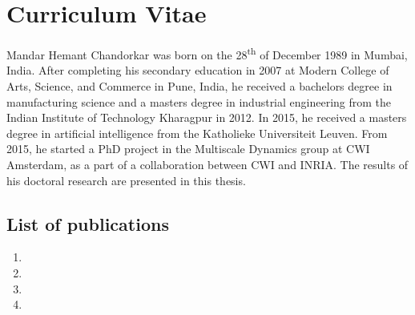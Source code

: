 \chapter*{Curriculum Vitae}\label{chapter:cv}
\thispagestyle{empty}


Mandar Hemant Chandorkar was born on the 28\textsuperscript{th} of December 1989 in Mumbai, India.
After completing his secondary education in 2007 at Modern College of Arts, Science, and Commerce 
in Pune, India, he received a bachelors degree in manufacturing science and a masters degree in 
industrial engineering from the Indian Institute of Technology Kharagpur in 2012. In 2015, he 
received a masters degree in artificial intelligence from the Katholieke Universiteit Leuven. 
%
From 2015, he started a PhD project in the Multiscale Dynamics group at CWI Amsterdam, 
as a part of a collaboration between CWI and INRIA. The results of his doctoral research are 
presented in this thesis.   

\section*{List of publications}
\begin{enumerate}
    \item {}
    \item {}
    \item {}
    \item {}
\end{enumerate}
\thispagestyle{empty}



